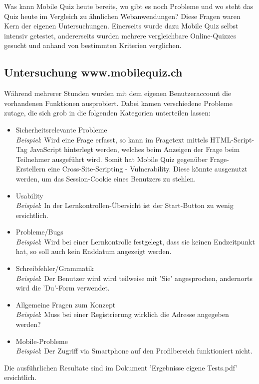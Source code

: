 Was kann Mobile Quiz heute bereits, wo gibt es noch Probleme und wo steht das Quiz heute im Vergleich zu ähnlichen Webanwendungen? Diese Fragen waren Kern der eigenen Untersuchungen. Einerseits wurde dazu Mobile Quiz selbst intensiv getestet, andererseits wurden mehrere vergleichbare Online-Quizzes gesucht und anhand von bestimmten Kriterien verglichen.


	\subsection{Untersuchung www.mobilequiz.ch}
	Während mehrerer Stunden wurden mit dem eigenen Benutzeraccount die vorhandenen Funktionen ausprobiert. Dabei kamen verschiedene Probleme zutage, die sich grob in die folgenden Kategorien unterteilen lassen:
	
	
	\begin{itemize}
		\item Sicherheitsrelevante Probleme \\
		\textit{Beispiel}: Wird eine Frage erfasst, so kann im Fragetext mittels HTML-Script-Tag JavaScript hinterlegt werden, welches beim Anzeigen der Frage beim Teilnehmer ausgeführt wird. Somit hat Mobile Quiz gegenüber Frage-Erstellern eine \gls{Cross-Site-Scripting} - \gls{Vulnerability}. Diese könnte ausgenutzt werden, um das Session-Cookie eines Benutzers zu stehlen.
		\item Usability \\
		\textit{Beispiel}: In der Lernkontrollen-Übersicht ist der Start-Button zu wenig ersichtlich.
		\item Probleme/Bugs \\
		\textit{Beispiel}: Wird bei einer Lernkontrolle festgelegt, dass sie keinen Endzeitpunkt hat, so soll auch kein Enddatum angezeigt werden.
		\item Schreibfehler/Grammatik \\
		\textit{Beispiel}: Der Benutzer wird wird teilweise mit 'Sie' angesprochen, andernorts wird die 'Du'-Form verwendet.
		\item Allgemeine Fragen zum Konzept \\
		\textit{Beispiel}: Muss bei einer Registrierung wirklich die Adresse angegeben werden?
		\item Mobile-Probleme \\
		\textit{Beispiel}: Der Zugriff via Smartphone auf den Profilbereich funktioniert nicht.
	\end{itemize}

	Die ausführlichen Resultate sind im Dokument 'Ergebnisse eigene Tests.pdf' ersichtlich.
	

